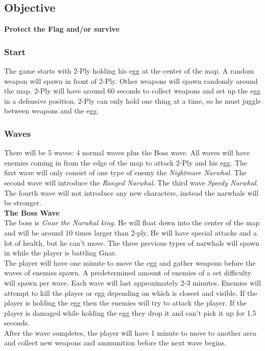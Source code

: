 \documentclass{article}
\begin{document}
\subsection{Objective}
\textbf{Protect the Flag and/or survive}
\subsubsection{Start}
The game starts with 2-Ply holding his egg at the center of the map. A random weapon will spawn in front of 2-Ply. Other weapons will spawn randomly around the map. 2-Ply will have around 60 seconds to collect weapons and set up the egg in a defensive position. 2-Ply can only hold one thing at a time, so he must juggle between weapons and the egg.

\subsubsection{Waves}
There will be 5 waves: 4 normal waves plus the Boss wave. All waves will have enemies coming in from the edge of the map to attack 2-Ply and his egg. The first wave will only consist of one type of enemy the \textit{Nightmare Narwhal}. The second wave will introduce the \textit{Ranged Narwhal}. The third wave \textit{Speedy Narwhal}. The fourth wave will not introduce any new characters, instead the narwhals will be stronger.\\
\textbf{The Boss Wave}\\
The boss is \textit{Gnar the Narwhal king}. He will float down into the center of the map and will be around 10 times larger than 2-ply. He will have special attacks and a lot of health, but he can't move. The three previous types of narwhals will spawn in while the player is battling Gnar.\\

The player will have one minute to move the egg and gather weapons before the waves of enemies spawn. A predetermined amount of enemies of a set difficulty will spawn per wave. Each wave will last approximately 2-3 minutes. Enemies will attempt to kill the player or egg depending on which is closest and visible. If the player is holding the egg then the enemies will try to attack the player. If the player is damaged while holding the egg they drop it and can't pick it up for 1.5 seconds.\\

After the wave completes, the player will have 1 minute to move to another area and collect new weapons and ammunition before the next wave begins.
\end{document}
